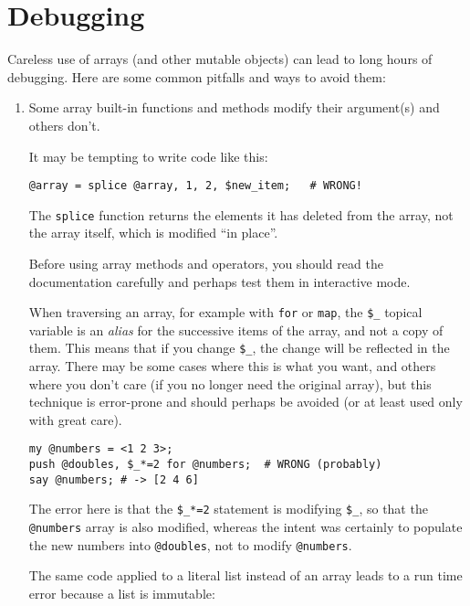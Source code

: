 \section{Debugging}

Careless use of arrays (and other mutable objects)
can lead to long hours of debugging.  Here are some common
pitfalls and ways to avoid them:

\begin{enumerate}

\item Some array built-in functions and methods modify 
their argument(s) and others don't.

It may be tempting to write code like this:

\begin{verbatim}
@array = splice @array, 1, 2, $new_item;   # WRONG!
\end{verbatim}

The {\tt splice} function returns the elements it has 
deleted from the array, not the array itself, which 
is modified ``in place''.

Before using array methods and operators, you should 
read the documentation carefully and perhaps test them 
in interactive mode.

When traversing an array, for example with {\tt for} 
or {\tt map}, the \verb'$_' topical variable is an 
\emph{alias} for the successive items of the array, and 
not a copy of them. This means that if you change 
\verb'$_', the change will be reflected in the array. 
There may be some cases where this is what you want, 
and others where you don't care (if you no longer need the 
original array), but this technique is error-prone and 
should perhaps be avoided (or at least used only with 
great care).

\begin{verbatim}
my @numbers = <1 2 3>;
push @doubles, $_*=2 for @numbers;  # WRONG (probably)
say @numbers; # -> [2 4 6]
\end{verbatim}

The error here is that the \verb'$_*=2' statement is 
modifying \verb'$_', so that the \verb'@numbers' array is 
also modified, whereas the intent was certainly to 
populate the new numbers into \verb'@doubles', not 
to modify \verb'@numbers'.

The same code applied to a literal list instead of an 
array leads to a run time error because a list is 
immutable:


\end{enumerate}
